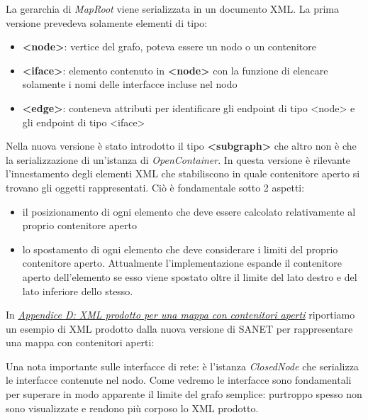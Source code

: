 \documentclass[a4wide,10pt,italian]{manual}
\begin{document}
La gerarchia di \emph{MapRoot} viene serializzata in un documento XML.
La prima versione prevedeva solamente elementi di tipo:
\begin{itemize}
\item {} 
\textbf{\textless{}node\textgreater{}}: vertice del grafo, poteva essere un nodo o un contenitore

\item {} 
\textbf{\textless{}iface\textgreater{}}: elemento contenuto in \textbf{\textless{}node\textgreater{}} con la funzione di elencare solamente i nomi delle interfacce incluse nel nodo

\item {} 
\textbf{\textless{}edge\textgreater{}}: conteneva attributi per identificare gli endpoint di tipo \textless{}node\textgreater{} e gli endpoint di tipo \textless{}iface\textgreater{}

\end{itemize}

Nella nuova versione è stato introdotto il tipo \textbf{\textless{}subgraph\textgreater{}}  che altro non è che la serializzazione
di un'istanza di \emph{OpenContainer}. In questa versione è rilevante l'innestamento degli elementi XML
che stabiliscono in quale contenitore aperto si trovano gli oggetti rappresentati. Ciò è fondamentale
sotto 2 aspetti:
\begin{itemize}
\item {} 
il posizionamento di ogni elemento che deve essere calcolato relativamente al proprio contenitore aperto

\item {} 
lo spostamento di ogni elemento che deve considerare i limiti del proprio contenitore aperto.
Attualmente l'implementazione espande il contenitore aperto dell'elemento se esso viene spostato oltre il limite
del lato destro e del lato inferiore dello stesso.

\end{itemize}

In \hyperlink{map-xml}{\emph{Appendice D: XML prodotto per una mappa con contenitori aperti}} riportiamo un esempio di XML prodotto dalla nuova versione di SANET per rappresentare una mappa con contenitori aperti:

Una nota importante sulle interfacce di rete: è l'istanza \emph{ClosedNode} che serializza le interfacce
contenute nel nodo. Come vedremo le interfacce sono fondamentali per superare in modo apparente il limite del grafo semplice: purtroppo spesso non sono visualizzate e rendono più corposo lo XML prodotto.
\end{document}
